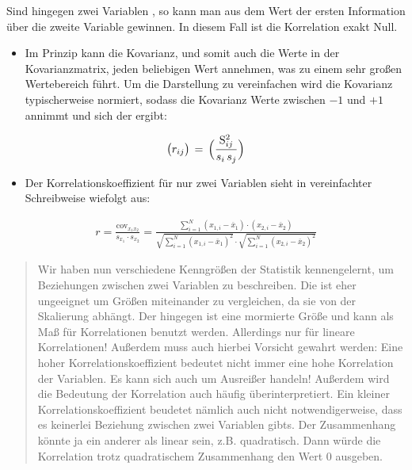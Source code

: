 \documentclass[letterpaper,10pt,english]{jupyterBook}
\begin{document}
Sind hingegen zwei Variablen , so kann man aus dem Wert der ersten  Information über die zweite Variable gewinnen. In diesem Fall ist die Korrelation exakt Null.
\begin{itemize}
\item {} 
\sphinxAtStartPar
Im Prinzip kann die Kovarianz, und somit auch die Werte in der Kovarianzmatrix, jeden beliebigen Wert annehmen, was zu einem sehr großen Wertebereich führt. Um die Darstellung zu vereinfachen wird die Kovarianz typischerweise normiert, sodass die Kovarianz Werte zwischen \(-1\) und \(+1\) annimmt und sich der  ergibt:

\end{itemize}
\begin{equation*}
\begin{split}\bigl( r_{ij} \bigr) \,=\, \Bigl (\frac{ \mathrm{S}^2_{ij} } {s_i\,s_j} \Bigr)\end{split}
\end{equation*}\begin{itemize}
\item {} 
\sphinxAtStartPar
Der Korrelationskoeffizient für nur zwei Variablen sieht in vereinfachter Schreibweise wiefolgt aus:

\end{itemize}
\begin{equation*}
\begin{split}r = \frac{\mathrm{cov}_{x_1x_2}}{s_{x_1} \cdot s_{x_2}} = \frac{\sum_{i=1}^N (x_{1,i}-\overline x_1)\cdot (x_{2,i}-\overline x_2)}{\sqrt{\sum_{i=1}^N (x_{1,i}-\overline x_1)^2} \cdot \sqrt{ \sum_{i=1}^N (x_{2,i}-\overline x_2)^2}}\end{split}
\end{equation*}\begin{quote}

\sphinxAtStartPar
Wir haben nun verschiedene Kenngrößen der Statistik kennengelernt, um Beziehungen zwischen zwei Variablen zu beschreiben. Die  ist eher ungeeignet um Größen miteinander zu vergleichen, da sie von der Skalierung abhängt. Der  hingegen ist eine mormierte Größe und kann als Maß für Korrelationen benutzt werden. Allerdings nur für lineare Korrelationen! Außerdem muss auch hierbei Vorsicht gewahrt werden: Eine hoher Korrelationskoeffizient bedeutet nicht immer eine hohe Korrelation der Variablen. Es kann sich auch um Ausreißer handeln! Außerdem wird die Bedeutung der Korrelation auch häufig überinterpretiert. Ein kleiner Korrelationskoeffizient beudetet nämlich auch nicht notwendigerweise, dass es keinerlei Beziehung zwischen zwei Variablen gibts. Der Zusammenhang könnte ja ein anderer als linear sein, z.B. quadratisch. Dann würde die Korrelation trotz quadratischem Zusammenhang den Wert 0 ausgeben.
\end{quote}
\end{document}
